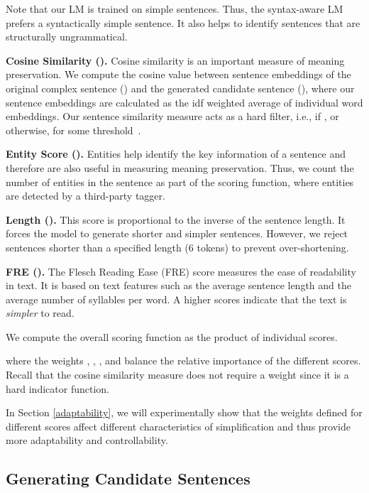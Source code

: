 \documentclass[11pt,a4paper]{article}
\begin{document}
Note that our LM is trained on simple sentences. Thus, the syntax-aware LM prefers a syntactically simple sentence. It also helps to identify sentences that are structurally ungrammatical. 

 
\textbf{Cosine Similarity (}\textbf{).} Cosine similarity is an important measure of meaning preservation. We compute the cosine value between sentence embeddings of the original complex sentence () and the generated candidate sentence (), where our sentence embeddings are calculated as the idf weighted average of individual word embeddings. Our sentence similarity measure acts as a hard filter, i.e.,  if , or  otherwise, for some threshold~.

\textbf{Entity Score (}\textbf{).} Entities help identify the key information of a sentence and therefore are also useful in measuring {meaning preservation}. Thus, we count the number of entities in the sentence as part of the scoring function, where entities are detected by a third-party tagger.

\textbf{Length (}\textbf{).}  This score is proportional to the inverse of the sentence length. It forces the model to generate {shorter} and {simpler} sentences. However, we reject sentences shorter than a specified length (6 tokens) to prevent over-shortening.

\textbf{FRE (}\textbf{).} The Flesch Reading Ease (FRE) score \cite{kincaid1975derivation} measures the ease of readability in text. It is based on text features such as the average sentence length and the average number of syllables per word. A higher scores indicate that the text is \textit{simpler} to read.

\smallskip
We compute the overall scoring function as the product of individual scores.

where the weights , , , and  balance the relative importance of the different scores. Recall that the cosine similarity measure does not require a weight since it is a hard indicator function.


In Section \ref{adaptability}, we will experimentally show that the weights defined for different scores affect different characteristics of simplification and thus provide more adaptability and controllability.

\subsection{Generating Candidate Sentences}
\label{subsec:candidates}
\end{document}
